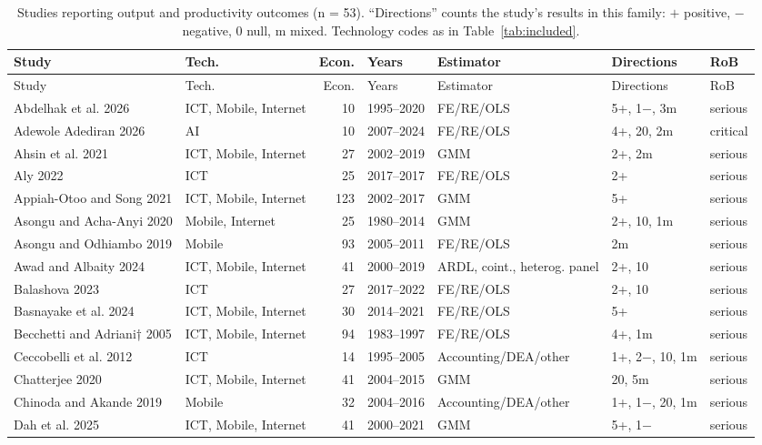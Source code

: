 {\scriptsize\setlength{\tabcolsep}{3pt}
\begin{longtable}{@{}p{3.1cm} p{1.9cm} r l p{2.4cm} p{2.3cm} l@{}}
\caption{Studies reporting output and productivity outcomes (n = 53). ``Directions'' counts the study's results in this family: $+$ positive, $-$ negative, 0 null, m mixed. Technology codes as in Table~\ref{tab:included}.}\label{tab:fam1}\\
\toprule Study & Tech. & Econ. & Years & Estimator & Directions & RoB \\ \midrule \endfirsthead
\toprule Study & Tech. & Econ. & Years & Estimator & Directions & RoB \\ \midrule \endhead
\bottomrule \endfoot
Abdelhak et al. 2026 & ICT, Mobile, Internet & 10 & 1995--2020 & FE/RE/OLS & 5+, 1$-$, 3m & serious \\
Adewole Adediran 2026 & AI & 10 & 2007--2024 & FE/RE/OLS & 4+, 20, 2m & critical \\
Ahsin et al. 2021 & ICT, Mobile, Internet & 27 & 2002--2019 & GMM & 2+, 2m & serious \\
Aly 2022 & ICT & 25 & 2017--2017 & FE/RE/OLS & 2+ & serious \\
Appiah-Otoo and Song 2021 & ICT, Mobile, Internet & 123 & 2002--2017 & GMM & 5+ & serious \\
Asongu and Acha-Anyi 2020 & Mobile, Internet & 25 & 1980--2014 & GMM & 2+, 10, 1m & serious \\
Asongu and Odhiambo 2019 & Mobile & 93 & 2005--2011 & FE/RE/OLS & 2m & serious \\
Awad and Albaity 2024 & ICT, Mobile, Internet & 41 & 2000--2019 & ARDL, coint., heterog. panel & 2+, 10 & serious \\
Balashova 2023 & ICT & 27 & 2017--2022 & FE/RE/OLS & 2+, 10 & serious \\
Basnayake et al. 2024 & ICT, Mobile, Internet & 30 & 2014--2021 & FE/RE/OLS & 5+ & serious \\
Becchetti and Adriani† 2005 & ICT, Mobile, Internet & 94 & 1983--1997 & FE/RE/OLS & 4+, 1m & serious \\
Ceccobelli et al. 2012 & ICT & 14 & 1995--2005 & Accounting/DEA/other & 1+, 2$-$, 10, 1m & serious \\
Chatterjee 2020 & ICT, Mobile, Internet & 41 & 2004--2015 & GMM & 20, 5m & serious \\
Chinoda and Akande 2019 & Mobile & 32 & 2004--2016 & Accounting/DEA/other & 1+, 1$-$, 20, 1m & serious \\
Dah et al. 2025 & ICT, Mobile, Internet & 41 & 2000--2021 & GMM & 5+, 1$-$ & serious \\

\end{longtable}}
